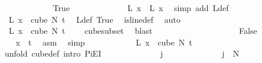 \begin{isabellebody}
\ \ \ \ \ \ \ \ \ \ \isamarkupfalse%
\ True\isanewline
\ \ \ \ \ \ \ \ \ \ \isamarkupfalse%
\ \isamarkupfalse%
\ {\isachardoublequoteopen}L{\isacharprime}{\kern0pt}\ x\ {\isacharequal}{\kern0pt}\ L\ x{\isachardoublequoteclose}\ \isamarkupfalse%
\ {\isacharparenleft}{\kern0pt}simp\ add{\isacharcolon}{\kern0pt}\ L{\isacharprime}{\kern0pt}{\isacharunderscore}{\kern0pt}def{\isacharparenright}{\kern0pt}\isanewline
\ \ \ \ \ \ \ \ \ \ \isamarkupfalse%
\ \isamarkupfalse%
\ {\isachardoublequoteopen}L{\isacharprime}{\kern0pt}\ x\ {\isasymin}\ cube\ N{\isacharprime}{\kern0pt}\ t{\isachardoublequoteclose}\ \isamarkupfalse%
\ L{\isacharunderscore}{\kern0pt}def\ True\ \isamarkupfalse%
\ is{\isacharunderscore}{\kern0pt}line{\isacharunderscore}{\kern0pt}def\ \isamarkupfalse%
\ auto\isanewline
\ \ \ \ \ \ \ \ \ \ \isamarkupfalse%
\ \isamarkupfalse%
\ {\isachardoublequoteopen}L{\isacharprime}{\kern0pt}\ x\ {\isasymin}\ cube\ N{\isacharprime}{\kern0pt}\ {\isacharparenleft}{\kern0pt}t\ {\isacharplus}{\kern0pt}\ {}{\isacharparenright}{\kern0pt}{\isachardoublequoteclose}\ \isamarkupfalse%
\ cube{\isacharunderscore}{\kern0pt}subset\ \isamarkupfalse%
\ blast\isanewline
\ \ \ \ \ \ \ \ \isamarkupfalse%
\isanewline
\ \ \ \ \ \ \ \ \ \ \isamarkupfalse%
\ False\isanewline
\ \ \ \ \ \ \ \ \ \ \isamarkupfalse%
\ \isamarkupfalse%
\ {\isachardoublequoteopen}x\ {\isacharequal}{\kern0pt}\ t{\isachardoublequoteclose}\ \isamarkupfalse%
\ asm\ \isamarkupfalse%
\ simp\isanewline
\ \ \ \ \ \ \ \ \ \ \isamarkupfalse%
\ {\isachardoublequoteopen}L{\isacharprime}{\kern0pt}\ x\ {\isasymin}\ cube\ N{\isacharprime}{\kern0pt}\ {\isacharparenleft}{\kern0pt}t\ {\isacharplus}{\kern0pt}\ {}{\isacharparenright}{\kern0pt}{\isachardoublequoteclose}\isanewline
\ \ \ \ \ \ \ \ \ \ \isamarkupfalse%
{\isacharparenleft}{\kern0pt}unfold\ cube{\isacharunderscore}{\kern0pt}def{\isacharcomma}{\kern0pt}\ intro\ PiE{\isacharunderscore}{\kern0pt}I{\isacharparenright}{\kern0pt}\isanewline
\ \ \ \ \ \ \ \ \ \ \ \ \isamarkupfalse%
\ j\isanewline
\ \ \ \ \ \ \ \ \ \ \ \ \isamarkupfalse%
\ {\isachardoublequoteopen}j\ {\isasymin}\ {\isacharbraceleft}{\kern0pt}{\isachardot}{\kern0pt}{\isachardot}{\kern0pt}{\isacharless}{\kern0pt}N{\isacharprime}{\kern0pt}{\isacharbraceright}{\kern0pt}{\isachardoublequoteclose}\isanewline

\end{isabellebody}
